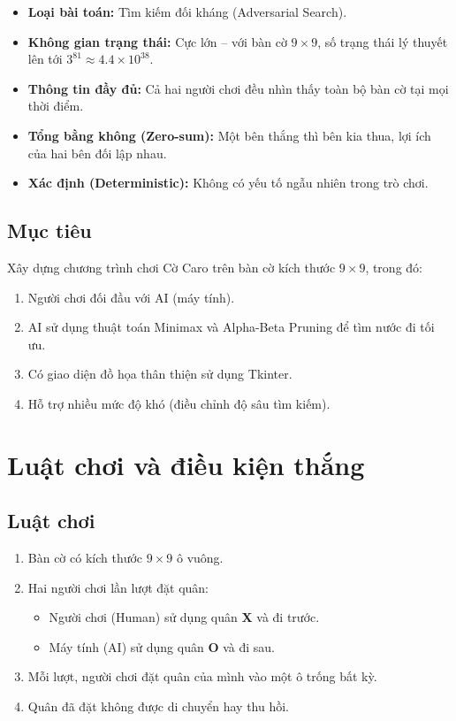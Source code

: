 \documentclass[12pt,a4paper]{article}
\begin{document}
\begin{itemize}[leftmargin=2cm]
    \item \textbf{Loại bài toán:} Tìm kiếm đối kháng (Adversarial Search).
    \item \textbf{Không gian trạng thái:} Cực lớn -- với bàn cờ $9 \times 9$, số trạng thái lý thuyết lên tới $3^{81} \approx 4.4 \times 10^{38}$.
    \item \textbf{Thông tin đầy đủ:} Cả hai người chơi đều nhìn thấy toàn bộ bàn cờ tại mọi thời điểm.
    \item \textbf{Tổng bằng không (Zero-sum):} Một bên thắng thì bên kia thua, lợi ích của hai bên đối lập nhau.
    \item \textbf{Xác định (Deterministic):} Không có yếu tố ngẫu nhiên trong trò chơi.
\end{itemize}

\subsection{Mục tiêu}

Xây dựng chương trình chơi Cờ Caro trên bàn cờ kích thước $9 \times 9$, trong đó:
\begin{enumerate}
    \item Người chơi đối đầu với AI (máy tính).
    \item AI sử dụng thuật toán Minimax và Alpha-Beta Pruning để tìm nước đi tối ưu.
    \item Có giao diện đồ họa thân thiện sử dụng Tkinter.
    \item Hỗ trợ nhiều mức độ khó (điều chỉnh độ sâu tìm kiếm).
\end{enumerate}

\section{Luật chơi và điều kiện thắng}

\subsection{Luật chơi}

\begin{enumerate}
    \item Bàn cờ có kích thước $9 \times 9$ ô vuông.
    \item Hai người chơi lần lượt đặt quân:
    \begin{itemize}
        \item Người chơi (Human) sử dụng quân \textbf{X} và đi trước.
        \item Máy tính (AI) sử dụng quân \textbf{O} và đi sau.
    \end{itemize}
    \item Mỗi lượt, người chơi đặt quân của mình vào một ô trống bất kỳ.
    \item Quân đã đặt không được di chuyển hay thu hồi.
\end{enumerate}
\end{document}
